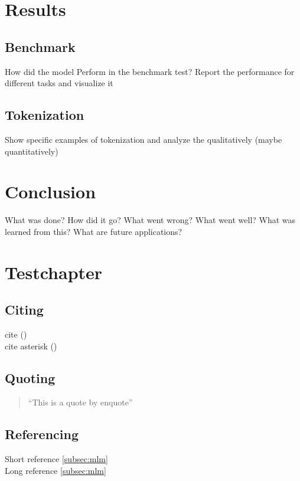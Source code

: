 \documentclass[english]{ttlab-qualify}
\begin{document}
    \chapter{Results}
    \label{ch:results}

    \section{Benchmark}
    \label{sec:benchmark}
    How did the model Perform in the benchmark test? Report the performance for different tasks and visualize it

    \section{Tokenization}
    \label{sec:tokenization}
    Show specific examples of tokenization and analyze the qualitatively (maybe quantitatively)

    \chapter{Conclusion}
    \label{ch:conclusion}

    What was done?
    How did it go?
    What went wrong?
    What went well?
    What was learned from this?
    What are future applications?

    \chapter{\latex Testchapter}
    \section{Citing}
    cite (\cite{METZLER2016})\\
    cite asterisk (\cite*{METZLER2016})\\

    \section{Quoting}
    \begin{quote}
        \enquote{This is a quote by enquote}
    \end{quote}

    \section{Referencing}
    Short reference \ref{subsec:mlm}\\
    Long reference \autoref{subsec:mlm}\\

    \appendix
    \printbibliography
\end{document}

